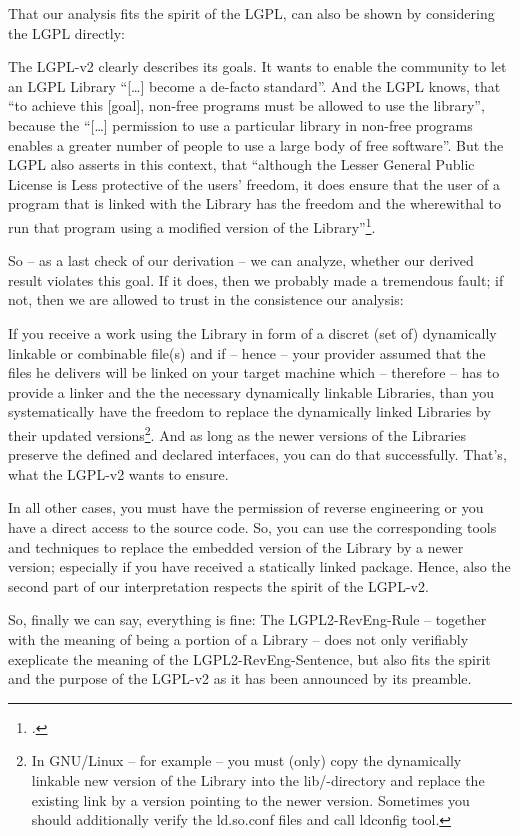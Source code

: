 That our analysis fits the spirit of the LGPL, can also be shown by considering
the LGPL directly:

The LGPL-v2 clearly describes its goals. It wants to enable the community to let
an LGPL Library \enquote{[\ldots] become a de-facto standard}. And the LGPL
knows, that \enquote{to achieve this [goal], non-free programs must be allowed
to use the library}, because the \enquote{[\ldots] permission to use a
particular library in non-free programs enables a greater number of people to
use a large body of free software}. But the LGPL also asserts in this context,
that \enquote{although the Lesser General Public License is Less protective of
the users' freedom, it does ensure that the user of a program that is linked
with the Library has the freedom and the wherewithal to run that program using a
modified version of the Library}\footcite[cf.][\nopage wp., preamble, emphasis
KR]{Lgpl21OsiLicense1999a}.

So -- as a last check of our derivation -- we can analyze, whether our derived
result violates this goal. If it does, then we probably made a tremendous fault;
if not, then we are allowed to trust in the consistence our analysis:

If you receive a work using the Library in form of a discret (set of)
dynamically linkable or combinable file(s) and if -- hence -- your provider
assumed that the files he delivers will be linked on your target machine which
-- therefore -- has to provide a linker and the the necessary dynamically
linkable Libraries, than you systematically have the freedom to replace the
dynamically linked Libraries by their updated versions\footnote{In GNU/Linux --
for example -- you must (only) copy the dynamically linkable new version of the
Library into the lib/-directory and replace the existing link by a version
pointing to the newer version. Sometimes you should additionally verify the
ld.so.conf files and call ldconfig tool.}. And as long as the newer versions of
the Libraries preserve the defined and declared interfaces, you can do that
successfully. That's, what the LGPL-v2 wants to ensure.

In all other cases, you must have the permission of reverse engineering or you
have a direct access to the source code. So, you can use the corresponding tools
and techniques to replace the embedded version of the Library by a newer
version; especially if you have received a statically linked package. Hence,
also the second part of our interpretation respects the spirit of the LGPL-v2.

So, finally we can say, everything is fine: The LGPL2-RevEng-Rule -- together
with the meaning of being a portion of a Library -- does not only verifiably
exeplicate the meaning of the LGPL2-RevEng-Sentence, but also fits the spirit
and the purpose of the LGPL-v2 as it has been announced by its preamble.



